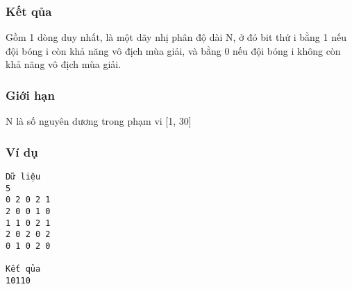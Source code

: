 \subsubsection{   Kết qủa  }

   Gồm 1 dòng duy nhất, là một dãy nhị phân độ dài N, ở đó bit thứ i bằng 1 nếu đội bóng i còn khả năng vô địch mùa giải, và bằng 0 nếu đội bóng i không còn khả năng vô địch mùa giải.  

\subsubsection{   Giới hạn  }

   N là số nguyên dương trong phạm vi [1, 30]  

\subsubsection{   Ví dụ  }
\begin{verbatim}
Dữ liệu
5
0 2 0 2 1 
2 0 0 1 0 
1 1 0 2 1 
2 0 2 0 2 
0 1 0 2 0

Kết qủa
10110

\end{verbatim}
